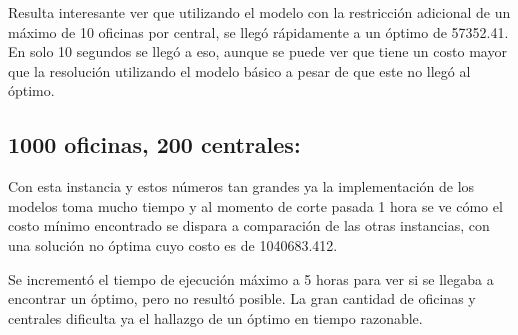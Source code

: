 \documentclass{article}
\begin{document}
Resulta interesante ver que utilizando el modelo con la restricción adicional de un máximo de 10 oficinas por central, se llegó rápidamente a un óptimo de 57352.41. En solo 10 segundos se llegó a eso, aunque se puede ver que tiene un costo mayor que la resolución utilizando el modelo básico a pesar de que este no llegó al óptimo.

\subsection*{1000 oficinas, 200 centrales:}
Con esta instancia y estos números tan grandes ya la implementación de los modelos toma mucho tiempo y al momento de corte pasada 1 hora se ve cómo el costo mínimo encontrado se dispara a comparación de las otras instancias, con una solución no óptima cuyo costo es de 1040683.412.

Se incrementó el tiempo de ejecución máximo a 5 horas para ver si se llegaba a encontrar un óptimo, pero no resultó posible. La gran cantidad de oficinas y centrales dificulta ya el hallazgo de un óptimo en tiempo razonable.
\end{document}
